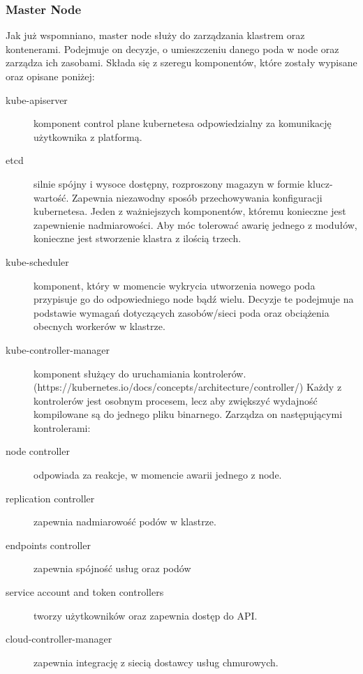 \documentclass[pl,final,oneside]{mgr} %
\begin{document}
\subsubsection{Master Node}
Jak już wspomniano, master node służy do zarządzania klastrem oraz kontenerami. Podejmuje on decyzje, o umieszczeniu danego poda w node oraz zarządza ich zasobami. Składa się z szeregu komponentów, które zostały wypisane oraz opisane poniżej:
\begin{description}
	\item [kube-apiserver] komponent control plane kubernetesa odpowiedzialny za komunikację użytkownika z platformą. 
	\item [etcd] silnie spójny i wysoce dostępny, rozproszony magazyn w formie klucz-wartość. Zapewnia niezawodny sposób przechowywania konfiguracji kubernetesa. Jeden z ważniejszych komponentów, któremu konieczne jest zapewnienie nadmiarowości. Aby móc tolerować awarię jednego z modułów, konieczne jest stworzenie klastra z ilością trzech.
	\item [kube-scheduler] komponent, który w momencie wykrycia utworzenia nowego poda przypisuje go do odpowiedniego node bądź wielu. Decyzje te podejmuje na podstawie wymagań dotyczących zasobów/sieci poda oraz obciążenia obecnych workerów w klastrze. 
	\item [kube-controller-manager] komponent służący do uruchamiania kontrolerów. (https://kubernetes.io/docs/concepts/architecture/controller/) Każdy z kontrolerów jest osobnym procesem, lecz aby zwiększyć wydajność kompilowane są do jednego pliku binarnego. Zarządza on następującymi kontrolerami:
	\item [node controller] odpowiada za reakcje, w momencie awarii jednego z node.
	\item [replication controller] zapewnia nadmiarowość podów w klastrze.
	\item [endpoints controller] zapewnia spójność usług oraz podów
	\item [service account and token controllers] tworzy użytkowników oraz zapewnia dostęp do API.
	\item [cloud-controller-manager] zapewnia integrację z siecią dostawcy usług chmurowych. 
\end{description}
\end{document}
